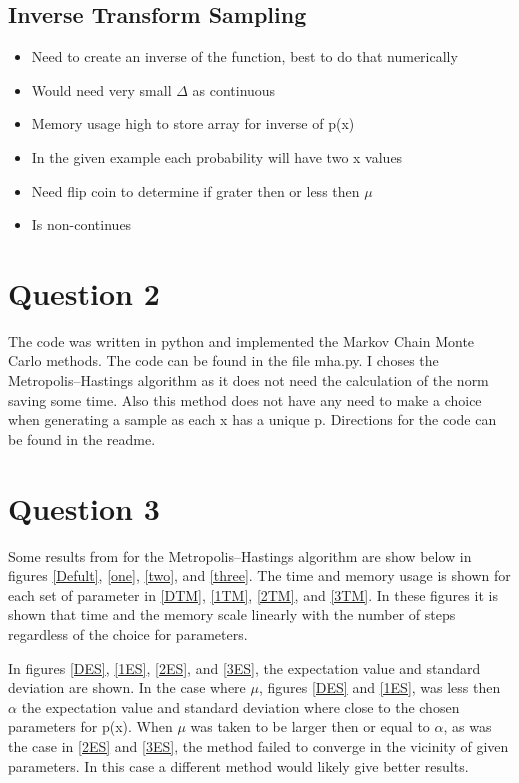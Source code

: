 \documentclass{article}
\begin{document}
\subsection{Inverse Transform Sampling}

\begin{itemize}
\itemsep-0.3cm 
\item Need to create an inverse of the function, best to do that numerically \\
\item Would need very small $\Delta$ as continuous\\
\item Memory usage high to store array for inverse of p(x)\\
\item In the given example each probability will have two x values\\
\item Need flip coin to determine if grater then or less then $\mu$\\
\item Is non-continues \citep{ITPCDF}\citep{KKCDF}
\end{itemize}

\section{Question 2}

The code was written in python and implemented the Markov Chain Monte Carlo methods. The code can be found in the file mha.py. I choses the Metropolis–Hastings algorithm as it does not need the calculation of the norm saving some time. Also this method does not have any need to make a choice when generating a sample as each x has a unique p. Directions for the code can be found in the readme.

\section{Question 3}

Some results from for the Metropolis–Hastings algorithm are show below in figures \ref{Defult}, \ref{one}, \ref{two}, and \ref{three}.  The time and memory usage is shown for each set of parameter in \ref{DTM}, \ref{1TM}, \ref{2TM}, and \ref{3TM}. In these figures it is shown that time and the memory scale linearly with the number of steps regardless of the choice for parameters. 

In figures  \ref{DES}, \ref{1ES}, \ref{2ES}, and \ref{3ES}, the expectation value and standard deviation are shown. In the case  where $\mu$, figures  \ref{DES} and \ref{1ES}, was less then $\alpha$ the expectation value and standard deviation where close to the chosen parameters for p(x). When $\mu$ was taken to be larger then or equal to $\alpha$, as was the case in \ref{2ES} and \ref{3ES}, the method failed to converge in the vicinity of  given parameters. In this case a different method would likely give better results. 
\end{document}
